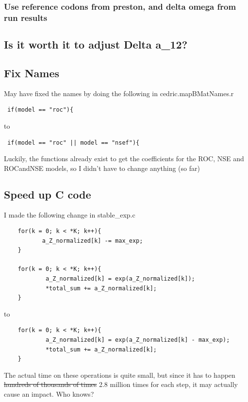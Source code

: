 \subsubsection{Use reference codons from preston, and delta omega from run results}

\subsection{Is it worth it to adjust Delta a\_12?}

\subsection{Fix Names}

May have fixed the names by doing the following in cedric.mapBMatNames.r

\begin{verbatim}
 if(model == "roc"){
\end{verbatim}

to

\begin{verbatim}
 if(model == "roc" || model == "nsef"){
\end{verbatim}

Luckily, the functions already exist to get the coefficients for the ROC, NSE and ROCandNSE models, so I didn't have to change anything (so far)

\subsection{Speed up C code}

I made the following change in stable\_exp.c

\begin{verbatim}
	for(k = 0; k < *K; k++){
	       a_Z_normalized[k] -= max_exp;
	}

	for(k = 0; k < *K; k++){
	        a_Z_normalized[k] = exp(a_Z_normalized[k]);
	        *total_sum += a_Z_normalized[k];
	}
\end{verbatim}

to

\begin{verbatim}
	for(k = 0; k < *K; k++){
	        a_Z_normalized[k] = exp(a_Z_normalized[k] - max_exp);
	        *total_sum += a_Z_normalized[k];
	}
\end{verbatim}

The actual time on these operations is quite small, but since it has to happen \sout{hundreds of thousands of times} 2.8 million times for each step, it may actually cause an impact. Who knows?


